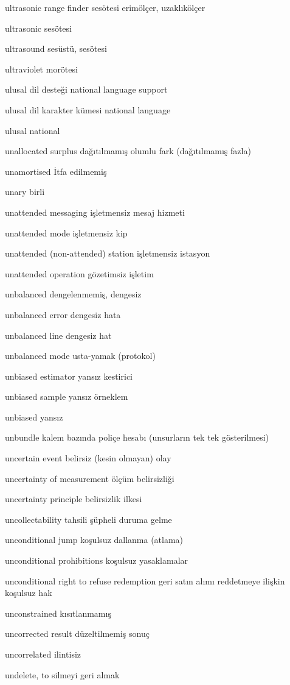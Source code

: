 \documentclass[12pt,fleqn]{article}\usepackage{../../common}
\begin{document}
ultrasonic range finder sesötesi erimölçer, uzaklıkölçer

ultrasonic sesötesi

ultrasound sesüstü, sesötesi

ultraviolet morötesi

ulusal dil desteği national language support

ulusal dil karakter kümesi national language

ulusal national

unallocated surplus dağıtılmamış olumlu fark (dağıtılmamış fazla)

unamortised İtfa edilmemiş

unary birli

unattended messaging işletmensiz mesaj hizmeti

unattended mode işletmensiz kip

unattended (non-attended) station işletmensiz istasyon

unattended operation gözetimsiz işletim

unbalanced dengelenmemiş, dengesiz

unbalanced error dengesiz hata

unbalanced line dengesiz hat

unbalanced mode usta-yamak (protokol)

unbiased estimator yansız kestirici

unbiased sample yansız örneklem

unbiased yansız

unbundle kalem bazında poliçe hesabı (unsurların tek tek gösterilmesi)

uncertain event belirsiz (kesin olmayan) olay

uncertainty of measurement ölçüm belirsizliği

uncertainty principle belirsizlik ilkesi

uncollectability tahsili şüpheli duruma gelme

unconditional jump koşulsuz dallanma (atlama)

unconditional prohibitions koşulsuz yasaklamalar

unconditional right to refuse redemption geri satın alımı reddetmeye ilişkin koşulsuz hak

unconstrained kısıtlanmamış

uncorrected result düzeltilmemiş sonuç

uncorrelated ilintisiz

undelete, to silmeyi geri almak
\end{document}
